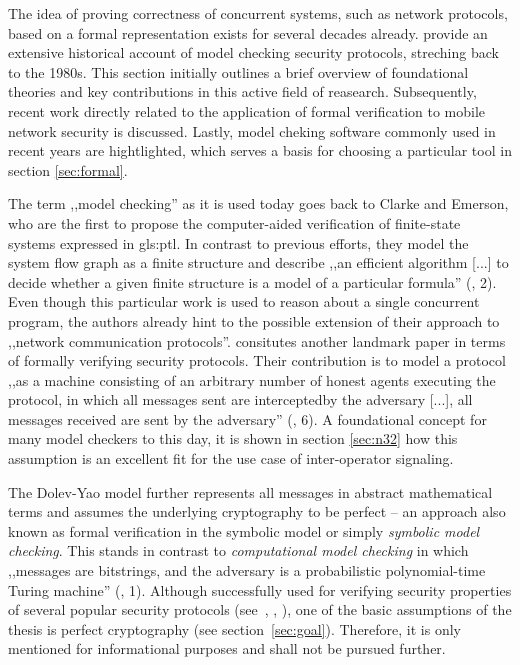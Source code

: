 The idea of proving correctness of concurrent systems, such as network protocols, based on a formal representation exists for several decades already.
\cite{basin2018model} provide an extensive historical account of model checking security protocols, streching back to the 1980s.
This section initially outlines a brief overview of foundational theories and key contributions in this active field of reasearch.
Subsequently, recent work directly related to the application of formal verification to mobile network security is discussed.
Lastly, model cheking software commonly used in recent years are hightlighted, which serves a basis for choosing a particular tool in section \ref{sec:formal}.

The term ,,model checking'' as it is used today goes back to Clarke and Emerson, who are the first to propose the computer-aided verification of finite-state systems expressed in \gls{gls:ptl}.
In contrast to previous efforts, they model the system flow graph as a finite structure and describe ,,an efficient algorithm [...] to decide whether a given finite structure is a model of a particular formula'' (\cite{clarke1981design}, 2).
Even though this particular work is used to reason about a single concurrent program, the authors already hint to the possible extension of their approach to ,,network communication protocols''.
\cite{dolev1983security} consitutes another landmark paper in terms of formally verifying security protocols.
Their contribution is to model a protocol ,,as a machine consisting of an arbitrary number of honest agents executing the protocol, in which all messages sent are interceptedby the adversary [...], all messages received are sent by the adversary'' (\cite{basin2018model}, 6).
A foundational concept for many model checkers to this day, it is shown in section \ref{sec:n32} how this assumption is an excellent fit for the use case of inter-operator signaling.

The Dolev-Yao model further represents all messages in abstract mathematical terms and assumes the underlying cryptography to be perfect -- an approach also known as formal verification in the symbolic model or simply \textit{symbolic model checking}.
This stands in contrast to \textit{computational model checking} in which ,,messages are bitstrings, and the adversary is a probabilistic polynomial-time Turing machine'' (\cite{blanchet2008computationally}, 1).
Although successfully used for verifying security properties of several popular security protocols (see~\cite{BlanchetJaggardScedrovTsayAsiaCCS08}, \cite{CadeBlanchetJoWUA13}, \cite{LippBlanchetBhargavanEuroSP19}), one of the basic assumptions of the thesis is perfect cryptography (see section~\ref{sec:goal}).
Therefore, it is only mentioned for informational purposes and shall not be pursued further.

